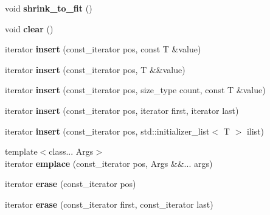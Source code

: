 \begin{DoxyCompactItemize}
\item 
\mbox{\label{classvector_a783c6cd87d48a80740919f81f8141a3e}} 
void {\bfseries shrink\+\_\+to\+\_\+fit} ()
\item 
\mbox{\label{classvector_a1f4d0e7d733ab573ecd6adb9b877ede4}} 
void {\bfseries clear} ()
\item 
\mbox{\label{classvector_acbfbbb1bd09726d26393c2ef475106c2}} 
iterator {\bfseries insert} (const\+\_\+iterator pos, const T \&value)
\item 
\mbox{\label{classvector_afa081b440c0bb7197e6416713effda38}} 
iterator {\bfseries insert} (const\+\_\+iterator pos, T \&\&value)
\item 
\mbox{\label{classvector_af512800bfaa6938b4abbec14ca220974}} 
iterator {\bfseries insert} (const\+\_\+iterator pos, size\+\_\+type count, const T \&value)
\item 
\mbox{\label{classvector_a070b032b55b98bae6066c600f8431774}} 
iterator {\bfseries insert} (const\+\_\+iterator pos, iterator first, iterator last)
\item 
\mbox{\label{classvector_ae6a2f29cdf99bf8ab1db7e5b4412a40a}} 
iterator {\bfseries insert} (const\+\_\+iterator pos, std\+::initializer\+\_\+list$<$ T $>$ ilist)
\item 
\mbox{\label{classvector_a8203490fe44adcb3db3d5230e08f776c}} 
{\footnotesize template$<$class... Args$>$ }\\iterator {\bfseries emplace} (const\+\_\+iterator pos, Args \&\&... args)
\item 
\mbox{\label{classvector_a6c042fabe17805055958d91002ee9d40}} 
iterator {\bfseries erase} (const\+\_\+iterator pos)
\item 
\mbox{\label{classvector_aa9ebfb9bb77842f9b0681c0c4f110749}} 
iterator {\bfseries erase} (const\+\_\+iterator first, const\+\_\+iterator last)
\item 
\mbox{\label{classvector_ac9049cc7af27d3f3bd1e8667e3b1b6eb}} 

\end{DoxyCompactItemize}
